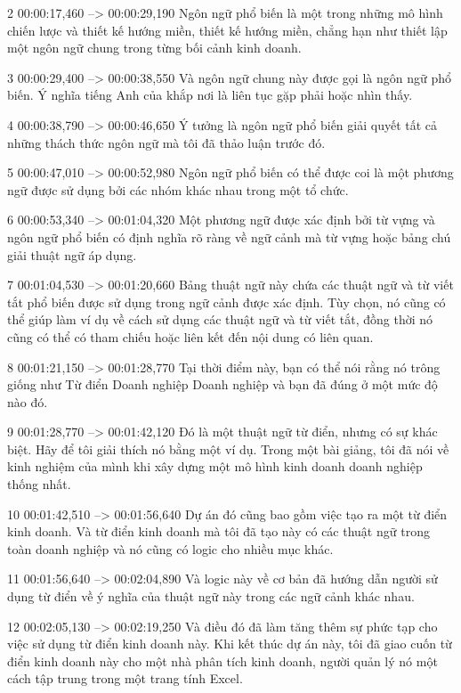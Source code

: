 2
00:00:17,460 --> 00:00:29,190
Ngôn ngữ phổ biến là một trong những mô hình chiến lược và thiết kế hướng miền, thiết kế hướng miền, chẳng hạn như thiết lập một ngôn ngữ chung trong từng bối cảnh kinh doanh.

3
00:00:29,400 --> 00:00:38,550
Và ngôn ngữ chung này được gọi là ngôn ngữ phổ biến.  Ý nghĩa tiếng Anh của khắp nơi là liên tục gặp phải hoặc nhìn thấy.

4
00:00:38,790 --> 00:00:46,650
Ý tưởng là ngôn ngữ phổ biến giải quyết tất cả những thách thức ngôn ngữ mà tôi đã thảo luận trước đó.

5
00:00:47,010 --> 00:00:52,980
Ngôn ngữ phổ biến có thể được coi là một phương ngữ được sử dụng bởi các nhóm khác nhau trong một tổ chức.

6
00:00:53,340 --> 00:01:04,320
Một phương ngữ được xác định bởi từ vựng và ngôn ngữ phổ biến có định nghĩa rõ ràng về ngữ cảnh mà từ vựng hoặc bảng chú giải thuật ngữ áp dụng.

7
00:01:04,530 --> 00:01:20,660
Bảng thuật ngữ này chứa các thuật ngữ và từ viết tắt phổ biến được sử dụng trong ngữ cảnh được xác định.  Tùy chọn, nó cũng có thể giúp làm ví dụ về cách sử dụng các thuật ngữ và từ viết tắt, đồng thời nó cũng có thể có tham chiếu hoặc liên kết đến nội dung có liên quan.

8
00:01:21,150 --> 00:01:28,770
Tại thời điểm này, bạn có thể nói rằng nó trông giống như Từ điển Doanh nghiệp Doanh nghiệp và bạn đã đúng ở một mức độ nào đó.

9
00:01:28,770 --> 00:01:42,120
Đó là một thuật ngữ từ điển, nhưng có sự khác biệt.  Hãy để tôi giải thích nó bằng một ví dụ.  Trong một bài giảng, tôi đã nói về kinh nghiệm của mình khi xây dựng một mô hình kinh doanh doanh nghiệp thống nhất.

10
00:01:42,510 --> 00:01:56,640
Dự án đó cũng bao gồm việc tạo ra một từ điển kinh doanh.  Và từ điển kinh doanh mà tôi đã tạo này có các thuật ngữ trong toàn doanh nghiệp và nó cũng có logic cho nhiều mục khác.

11
00:01:56,640 --> 00:02:04,890
Và logic này về cơ bản đã hướng dẫn người sử dụng từ điển về ý nghĩa của thuật ngữ này trong các ngữ cảnh khác nhau.

12
00:02:05,130 --> 00:02:19,250
Và điều đó đã làm tăng thêm sự phức tạp cho việc sử dụng từ điển kinh doanh này.  Khi kết thúc dự án này, tôi đã giao cuốn từ điển kinh doanh này cho một nhà phân tích kinh doanh, người quản lý nó một cách tập trung trong một trang tính Excel.


